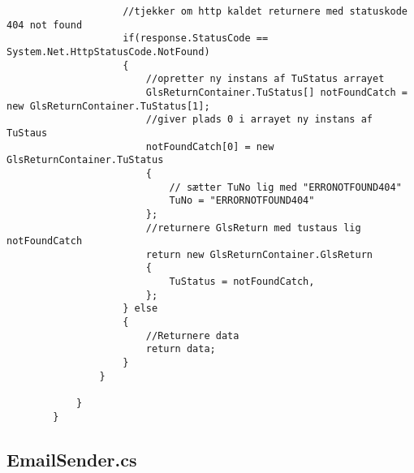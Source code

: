 \begin{verbatim}
                    //tjekker om http kaldet returnere med statuskode 404 not found
                    if(response.StatusCode == System.Net.HttpStatusCode.NotFound)
                    {
                        //opretter ny instans af TuStatus arrayet
                        GlsReturnContainer.TuStatus[] notFoundCatch = new GlsReturnContainer.TuStatus[1];
                        //giver plads 0 i arrayet ny instans af TuStaus 
                        notFoundCatch[0] = new GlsReturnContainer.TuStatus 
                        { 
                            // sætter TuNo lig med "ERRONOTFOUND404"
                            TuNo = "ERRORNOTFOUND404"
                        };
                        //returnere GlsReturn med tustaus lig notFoundCatch
                        return new GlsReturnContainer.GlsReturn
                        {
                            TuStatus = notFoundCatch,
                        };
                    } else
                    {
                        //Returnere data
                        return data;
                    }
                }
        
            }
        }
\end{verbatim}

\subsection{EmailSender.cs}

